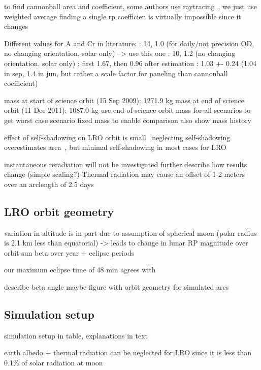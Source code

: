 to find cannonball area and coefficient, some authors use raytracing~\cite{Hattori2019}, we just use weighted average
finding a single rp coefficien is virtually impossible since it changes~\cite[p~580]{Vallado2013}

Different values for A and Cr in literature:
\cite{Nicholson2010}: 14, 1.0 (for daily/not precision OD, no changing orientation, solar only) --> use this one
\cite{Bauer2016}: 10, 1.2 (no changing orientation, solar only)
\cite{Slojkowski2015}: first 1.67, then 0.96 after estimation
\cite{Mazarico2018}: 1.03 +- 0.24 (1.04 in sep, 1.4 in jun, but rather a scale factor for paneling than cannonball coefficient)

mass at start of science orbit (15 Sep 2009): 1271.9 kg
mass at end of science orbit (11 Dec 2011): 1087.0 kg
use end of science orbit mass for all scenarios to get worst case scenario
fixed mass to enable comparison
also show mass history

effect of self-shadowing on LRO orbit is small~\cite{Loecher2018}
neglecting self-shadowing overestimates area~\cite{Mazarico2009}, but minimal self-shadowing in most cases for LRO~\cite{Slojkowski2015}

instantaneous reradiation
will not be investigated further
describe how results change (simple scaling?)
Thermal radiation may cause an offset of 1-2 meters over an arclength of 2.5 days~\cite{Bauer2016}



\subsection{LRO orbit geometry}
variation in altitude is in part due to assumption of spherical moon (polar radius is 2.1 km less than equatorial) -> leads to change in lunar RP magnitude over orbit
sun beta over year + eclipse periods

our maximum eclipse time of 48 min agrees with \cite{Tooley2010}

describe beta angle
maybe figure with orbit geometry for simulated arcs


\subsection{Simulation setup}

simulation setup in table, explanations in text

earth albedo + thermal radiation can be neglected for LRO since it is less than 0.1\% of solar radiation at moon

